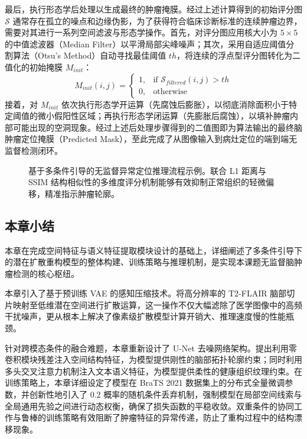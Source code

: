 \documentclass[Win]{xjtuBSThesis}  %
\begin{document}
最后，执行形态学后处理以生成最终的肿瘤掩膜。经过上述计算得到的初始评分图 $\mathcal{S}$ 通常存在孤立的噪点和边缘伪影，为了获得符合临床诊断标准的连续肿瘤边界，需要对其进行一系列空间滤波与形态学操作。首先，对评分图应用核大小为 $5 \times 5$ 的中值滤波器（Median Filter）以平滑局部尖峰噪声；其次，采用自适应阈值分割算法（Otsu's Method）自动寻找最佳阈值 $th$，将连续的浮点型评分图转化为二值化的初始掩膜 $M_{init}$：
$$M_{init}(i, j) = \begin{cases} 1, & \text{if } \mathcal{S}_{filtered}(i, j) > th \\ 0, & \text{otherwise} \end{cases}$$
接着，对 $M_{init}$ 依次执行形态学开运算（先腐蚀后膨胀），以彻底消除面积小于特定阈值的微小假阳性区域；再执行形态学闭运算（先膨胀后腐蚀），以填补肿瘤内部可能出现的空洞现象。经过上述后处理步骤得到的二值图即为算法输出的最终脑肿瘤定位掩膜（Predicted Mask），至此完成了从图像输入到病灶定位的端到端无监督检测闭环。

\begin{figure}[htbp]
    \centering
    \caption{基于多条件引导的无监督异常定位推理流程示例。联合 L1 距离与 SSIM 结构相似性的多维度评分机制能够有效抑制正常组织的轻微偏移，精准指示肿瘤轮廓。}
    \label{fig:anomaly_localization_result}
\end{figure}

\subsection{本章小结}

本章在完成空间特征与语义特征提取模块设计的基础上，详细阐述了多条件引导下的潜在扩散重构模型的整体构建、训练策略与推理机制，是实现本课题无监督脑肿瘤检测的核心枢纽。

本章引入了基于预训练 VAE 的感知压缩技术。将高分辨率的 T2-FLAIR 脑部切片映射至低维潜在空间进行扩散运算，这一操作不仅大幅滤除了医学图像中的高频干扰噪声，更从根本上解决了像素级扩散模型计算开销大、推理速度慢的性能瓶颈。

针对跨模态条件的融合难题，本章重新设计了 U-Net 去噪网络架构。提出利用零卷积模块残差注入空间结构特征，为模型提供刚性的脑部拓扑轮廓约束；同时利用多头交叉注意力机制注入文本语义特征，为模型提供柔性的健康组织纹理约束。在训练策略上，本章详细设定了模型在 BraTS 2021 数据集上的分布式全量微调参数，并创新性地引入了 0.2 概率的随机条件丢弃机制，强制模型在局部空间线索与全局通用先验之间进行动态权衡，确保了损失函数的平稳收敛。双重条件的协同工作与鲁棒的训练策略有效阻断了肿瘤特征的异常传递，防止了重构过程中的结构漂移现象。
\end{document}
